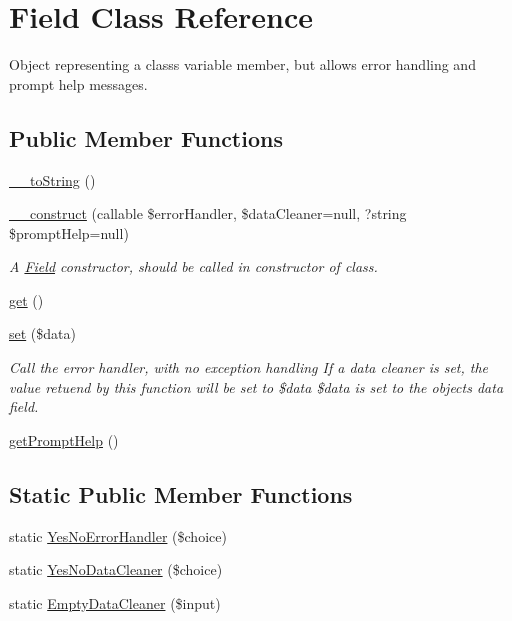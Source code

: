 \hypertarget{classField}{}\section{Field Class Reference}
\label{classField}


Object representing a class\textquotesingle{}s variable member, but allows error handling and prompt help messages.  


\subsection*{Public Member Functions}
\begin{DoxyCompactItemize}
\item 
\hyperlink{classField_ae052e0e3c5726e58db49bdbc1e2df358}{\+\_\+\+\_\+to\+String} ()
\item 
\hyperlink{classField_a360a1d2e980c0168004a5e2d29505995}{\+\_\+\+\_\+construct} (callable \$error\+Handler, \$data\+Cleaner=null, ?string \$prompt\+Help=null)
\begin{DoxyCompactList}\small\item\em A \hyperlink{classField}{Field} constructor, should be called in constructor of class. \end{DoxyCompactList}\item 
\hyperlink{classField_a0256105b39f3e33f4a52ec0dabca6369}{get} ()
\item 
\hyperlink{classField_a0c9ef207aaf0de57c8f4a0a96a25d5e4}{set} (\$data)
\begin{DoxyCompactList}\small\item\em Call the error handler, with no exception handling If a data cleaner is set, the value retuend by this function will be set to {\ttfamily \$data} {\ttfamily \$data} is set to the object\textquotesingle{}s data field. \end{DoxyCompactList}\item 
\hyperlink{classField_a0a70ba06268a998a95875ab373c981c8}{get\+Prompt\+Help} ()
\end{DoxyCompactItemize}
\subsection*{Static Public Member Functions}
\begin{DoxyCompactItemize}
\item 
static \hyperlink{classField_a1264ea9bdc12d6d5b6e6189508276ebb}{Yes\+No\+Error\+Handler} (\$choice)
\item 
static \hyperlink{classField_a5f84b56e8ea34c9b15081751366392c8}{Yes\+No\+Data\+Cleaner} (\$choice)
\item 
static \hyperlink{classField_aae2d2da0cdb35adf97d9a83664613b7d}{Empty\+Data\+Cleaner} (\$input)
\end{DoxyCompactItemize}
